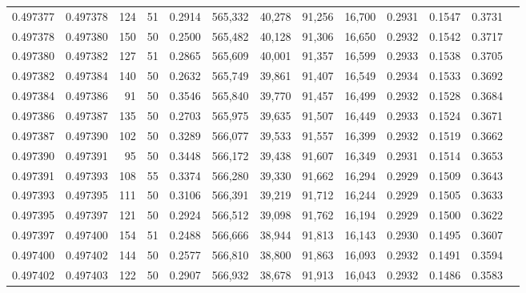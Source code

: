 \begin{tabular}{rrrrrrrrrrrrr}
0.497377 & 0.497378 &   124 &  51 &                                     0.2914 & 565,332 &  40,278 &  91,256 &  16,700 & 0.2931 & 0.1547 & 0.3731 \\
0.497378 & 0.497380 &   150 &  50 &                                     0.2500 & 565,482 &  40,128 &  91,306 &  16,650 & 0.2932 & 0.1542 & 0.3717 \\
0.497380 & 0.497382 &   127 &  51 &                                     0.2865 & 565,609 &  40,001 &  91,357 &  16,599 & 0.2933 & 0.1538 & 0.3705 \\
0.497382 & 0.497384 &   140 &  50 &                                     0.2632 & 565,749 &  39,861 &  91,407 &  16,549 & 0.2934 & 0.1533 & 0.3692 \\
0.497384 & 0.497386 &    91 &  50 &                                     0.3546 & 565,840 &  39,770 &  91,457 &  16,499 & 0.2932 & 0.1528 & 0.3684 \\
0.497386 & 0.497387 &   135 &  50 &                                     0.2703 & 565,975 &  39,635 &  91,507 &  16,449 & 0.2933 & 0.1524 & 0.3671 \\
0.497387 & 0.497390 &   102 &  50 &                                     0.3289 & 566,077 &  39,533 &  91,557 &  16,399 & 0.2932 & 0.1519 & 0.3662 \\
0.497390 & 0.497391 &    95 &  50 &                                     0.3448 & 566,172 &  39,438 &  91,607 &  16,349 & 0.2931 & 0.1514 & 0.3653 \\
0.497391 & 0.497393 &   108 &  55 &                                     0.3374 & 566,280 &  39,330 &  91,662 &  16,294 & 0.2929 & 0.1509 & 0.3643 \\
0.497393 & 0.497395 &   111 &  50 &                                     0.3106 & 566,391 &  39,219 &  91,712 &  16,244 & 0.2929 & 0.1505 & 0.3633 \\
0.497395 & 0.497397 &   121 &  50 &                                     0.2924 & 566,512 &  39,098 &  91,762 &  16,194 & 0.2929 & 0.1500 & 0.3622 \\
0.497397 & 0.497400 &   154 &  51 &                                     0.2488 & 566,666 &  38,944 &  91,813 &  16,143 & 0.2930 & 0.1495 & 0.3607 \\
0.497400 & 0.497402 &   144 &  50 &                                     0.2577 & 566,810 &  38,800 &  91,863 &  16,093 & 0.2932 & 0.1491 & 0.3594 \\
0.497402 & 0.497403 &   122 &  50 &                                     0.2907 & 566,932 &  38,678 &  91,913 &  16,043 & 0.2932 & 0.1486 & 0.3583 \\

\end{tabular}
